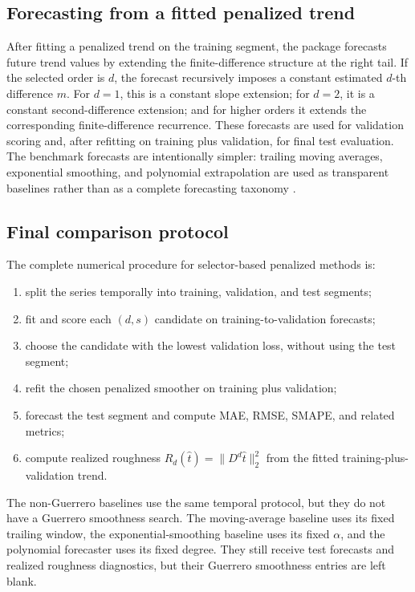 \subsection{Forecasting from a fitted penalized trend}
After fitting a penalized trend on the training segment, the package forecasts
future trend values by extending the finite-difference structure at the right
tail. If the selected order is \(d\), the forecast recursively imposes a
constant estimated \(d\)-th difference \(m\). For \(d=1\), this is a constant
slope extension; for \(d=2\), it is a constant second-difference extension; and
for higher orders it extends the corresponding finite-difference recurrence.
These forecasts are used for validation scoring and, after refitting on
training plus validation, for final test evaluation. The benchmark forecasts
are intentionally simpler: trailing moving averages, exponential smoothing, and
polynomial extrapolation are used as transparent baselines rather than as a
complete forecasting taxonomy \citep{brown1959forecasting,holt2004exponential,
winters1960forecasting,gardner1985exponential,gardner2006exponential,
draper1998regression}.

\subsection{Final comparison protocol}
The complete numerical procedure for selector-based penalized methods is:
\begin{enumerate}
  \item split the series temporally into training, validation, and test
        segments;
  \item fit and score each \((d,s)\) candidate on training-to-validation
        forecasts;
  \item choose the candidate with the lowest validation loss, without using the
        test segment;
  \item refit the chosen penalized smoother on training plus validation;
  \item forecast the test segment and compute MAE, RMSE, SMAPE, and related
        metrics;
  \item compute realized roughness \(R_d(\hat{t})=\|D^d\hat{t}\|_2^2\) from the
        fitted training-plus-validation trend.
\end{enumerate}
The non-Guerrero baselines use the same temporal protocol, but they do not have
a Guerrero smoothness search. The moving-average baseline uses its fixed
trailing window, the exponential-smoothing baseline uses its fixed \(\alpha\),
and the polynomial forecaster uses its fixed degree. They still receive test
forecasts and realized roughness diagnostics, but their Guerrero smoothness
entries are left blank.

